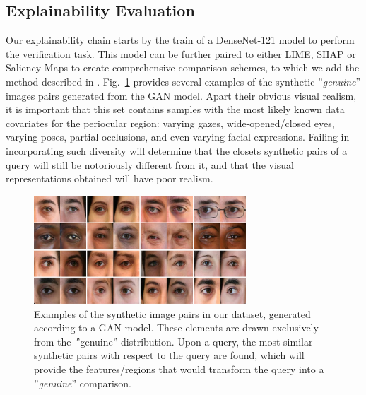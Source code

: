 \documentclass[final]{cvpr}
\begin{document}
\subsection{Explainability Evaluation}
\label{subsec:qualitative_evaluation}

 Our explainability chain starts by the train of a DenseNet-121 model to perform the verification task. This model can be further paired to either LIME, SHAP or Saliency Maps to create comprehensive comparison schemes, to which we add the method described in \cite{interpretability_by_parts}. 
Fig.~\ref{fig_synthetic} provides several examples of the synthetic ''\emph{genuine}'' images pairs generated from the GAN model. Apart their obvious visual realism, it is important that this set contains samples with the most likely known data covariates for the periocular region: varying gazes, wide-opened/closed eyes, varying poses, partial occlusions, and even varying facial expressions. Failing in incorporating such diversity will determine that the closets synthetic pairs of a query will still be notoriously different from it, and that the visual representations obtained will have poor realism.  

 \begin{figure}
  \begin{center}
  \includegraphics[width=225pt]{figures/images_GANs.pdf}
  \caption{Examples of the synthetic image pairs in our dataset, generated according to a GAN model. These elements are drawn exclusively from the \emph''{genuine}'' distribution. Upon  a query, the most similar synthetic pairs with respect to the query are found, which will provide the features/regions that would transform the query into a ''\emph{genuine}'' comparison.}
  \label{fig_synthetic}
  \end{center}
\end{figure}
\end{document}
